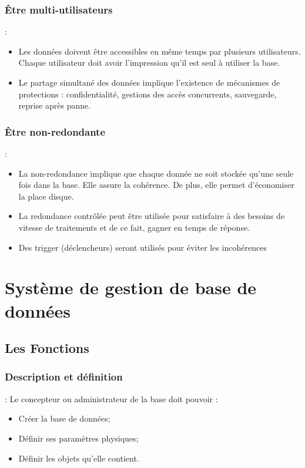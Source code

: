 \documentclass[10pt]{beamer}
\begin{document}
\subsubsection{Être multi-utilisateurs}
\begin{frame}{\subsecname : \subsubsecname}
    \begin{itemize}
        \item Les données doivent être accessibles en même temps par plusieurs utilisateurs.
              Chaque utilisateur doit avoir l’impression qu’il est seul à utiliser la base.
        \item Le partage simultané des données implique l’existence de mécanismes de protections : confidentialité, gestions des accès concurrents, sauvegarde, reprise après panne.
    \end{itemize}
\end{frame}

\subsubsection{Être non-redondante}
\begin{frame}{\subsecname : \subsubsecname}
    \begin{itemize}
        \item La non-redondance implique que chaque donnée ne soit stockée qu’une seule fois dans la base.  Elle assure la cohérence. De plus, elle permet d’économiser la place disque.
        \item La redondance contrôlée peut être utilisée pour satisfaire à des besoins de vitesse de traitements et de ce fait, gagner en temps de réponse.
        \item Des trigger (déclencheurs) seront utilisés pour éviter les incohérences
    \end{itemize}
\end{frame}


\section{Système de gestion de base de données}
\tocss

\subsection{Les Fonctions}
\tocsss


\subsubsection{Description et définition}
\begin{frame}{\subsecname : \subsubsecname}
    Le concepteur ou administrateur de la base doit pouvoir :
    \begin{itemize}
        \item Créer la base de données;
        \item Définir ses paramètres physiques;
        \item Définir les objets qu’elle contient.
    \end{itemize}
\end{frame}
\end{document}
